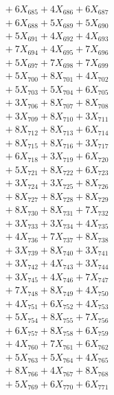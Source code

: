 \documentclass[a4paper,10pt]{article}
\begin{document}
{\begin{align}
&\;  + 6 X_{685} + 4 X_{686} + 6 X_{687} \\[0.3ex]
&\;  + 6 X_{688} + 5 X_{689} + 5 X_{690} \\[0.3ex]
&\;  + 5 X_{691} + 4 X_{692} + 4 X_{693} \\[0.3ex]
&\;  + 7 X_{694} + 4 X_{695} + 7 X_{696} \\[0.3ex]
&\;  + 5 X_{697} + 7 X_{698} + 7 X_{699} \\[0.5ex]\allowbreak
&\;  + 5 X_{700} + 8 X_{701} + 4 X_{702} \\[0.3ex]
&\;  + 5 X_{703} + 5 X_{704} + 6 X_{705} \\[0.3ex]
&\;  + 3 X_{706} + 8 X_{707} + 8 X_{708} \\[0.3ex]
&\;  + 3 X_{709} + 8 X_{710} + 3 X_{711} \\[0.3ex]
&\;  + 8 X_{712} + 8 X_{713} + 6 X_{714} \\[0.3ex]
&\;  + 8 X_{715} + 8 X_{716} + 3 X_{717} \\[0.3ex]
&\;  + 6 X_{718} + 3 X_{719} + 6 X_{720} \\[0.3ex]
&\;  + 5 X_{721} + 8 X_{722} + 6 X_{723} \\[0.3ex]
&\;  + 3 X_{724} + 3 X_{725} + 8 X_{726} \\[0.3ex]
&\;  + 8 X_{727} + 8 X_{728} + 8 X_{729} \\[0.5ex]\allowbreak
&\;  + 8 X_{730} + 8 X_{731} + 7 X_{732} \\[0.3ex]
&\;  + 3 X_{733} + 3 X_{734} + 4 X_{735} \\[0.3ex]
&\;  + 4 X_{736} + 7 X_{737} + 8 X_{738} \\[0.3ex]
&\;  + 3 X_{739} + 8 X_{740} + 3 X_{741} \\[0.3ex]
&\;  + 3 X_{742} + 4 X_{743} + 3 X_{744} \\[0.3ex]
&\;  + 3 X_{745} + 4 X_{746} + 7 X_{747} \\[0.3ex]
&\;  + 7 X_{748} + 8 X_{749} + 4 X_{750} \\[0.3ex]
&\;  + 4 X_{751} + 6 X_{752} + 4 X_{753} \\[0.3ex]
&\;  + 5 X_{754} + 8 X_{755} + 7 X_{756} \\[0.3ex]
&\;  + 6 X_{757} + 8 X_{758} + 6 X_{759} \\[0.5ex]\allowbreak
&\;  + 4 X_{760} + 7 X_{761} + 6 X_{762} \\[0.3ex]
&\;  + 5 X_{763} + 5 X_{764} + 4 X_{765} \\[0.3ex]
&\;  + 8 X_{766} + 4 X_{767} + 8 X_{768} \\[0.3ex]
&\;  + 5 X_{769} + 6 X_{770} + 6 X_{771} \\[0.3ex]

\end{align}}
\end{document}
